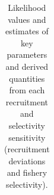 \documentclass[
  english,
]{article}
\begin{document}
\newpage{}

\begin{landscape}
\begingroup
\fontsize{9.0pt}{11.0pt}\selectfont

\begin{longtable}{>{\raggedright\arraybackslash}p{\dimexpr 56.25pt -2\tabcolsep-1.5\arrayrulewidth}>{\raggedright\arraybackslash}p{\dimexpr 150.00pt -2\tabcolsep-1.5\arrayrulewidth}>{\raggedright\arraybackslash}p{\dimexpr 56.25pt -2\tabcolsep-1.5\arrayrulewidth}>{\raggedright\arraybackslash}p{\dimexpr 56.25pt -2\tabcolsep-1.5\arrayrulewidth}>{\raggedright\arraybackslash}p{\dimexpr 56.25pt -2\tabcolsep-1.5\arrayrulewidth}>{\raggedright\arraybackslash}p{\dimexpr 56.25pt -2\tabcolsep-1.5\arrayrulewidth}>{\raggedright\arraybackslash}p{\dimexpr 56.25pt -2\tabcolsep-1.5\arrayrulewidth}>{\raggedright\arraybackslash}p{\dimexpr 56.25pt -2\tabcolsep-1.5\arrayrulewidth}}

\caption{\label{tbl-sensitivities-sel-rec_2}Likelihood values and
estimates of key parameters and derived quantities from each recruitment
and selectivity sensitivity (recruitment deviations and fishery
selectivity).}

\tabularnewline


\end{longtable}
\end{landscape}
\end{document}
